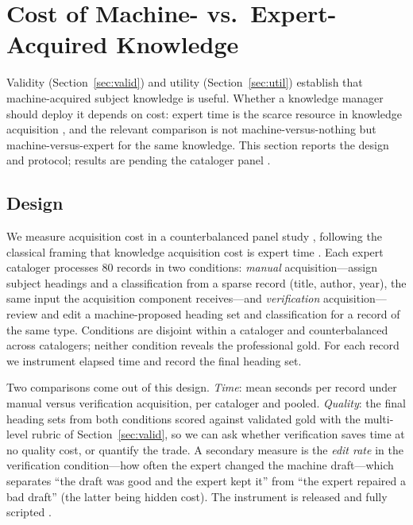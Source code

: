 
\section{Cost of Machine- vs.\ Expert-Acquired Knowledge}
\label{sec:cost}

Validity (Section~\ref{sec:valid}) and utility (Section~\ref{sec:util})
establish that machine-acquired subject knowledge is useful. Whether a
knowledge manager should deploy it depends on cost: expert time is the
scarce resource in knowledge acquisition \cite{feigenbaum_knowledge_engineering},
and the relevant comparison is not machine-versus-nothing but
machine-versus-expert for the same knowledge. This section reports the
design and protocol; results are pending the cataloger panel
.

\subsection{Design}

We measure acquisition cost in a counterbalanced panel study
, following the classical framing that knowledge acquisition cost
is expert time \cite{studer_knowledge_engineering}. Each expert cataloger
processes 80 records in two conditions: \emph{manual} acquisition---assign
subject headings and a classification from a sparse record (title, author,
year), the same input the acquisition component receives---and
\emph{verification} acquisition---review and edit a machine-proposed
heading set and classification for a record of the same type. Conditions are
disjoint within a cataloger and counterbalanced across catalogers; neither
condition reveals the professional gold. For each record we instrument
elapsed time and record the final heading set.

Two comparisons come out of this design. \emph{Time}: mean seconds per
record under manual versus verification acquisition, per cataloger and
pooled. \emph{Quality}: the final heading sets from both conditions scored
against validated gold with the multi-level rubric of
Section~\ref{sec:valid}, so we can ask whether verification saves time at
no quality cost, or quantify the trade. A secondary measure is the
\emph{edit rate} in the verification condition---how often the expert
changed the machine draft---which separates ``the draft was good and the
expert kept it'' from ``the expert repaired a bad draft'' (the latter being
hidden cost). The instrument is released and fully scripted
.

